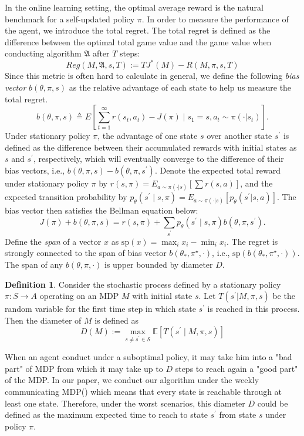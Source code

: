 \documentclass{article}
\theoremstyle{plain}
\theoremstyle{definition}
\newtheorem{definition}[theorem]{Definition}
\theoremstyle{remark}
\begin{document}
In the online learning setting, the optimal average reward is the natural benchmark for a self-updated policy $\pi$. In order to measure the performance of the agent, we introduce the total regret. The total regret is defined as the difference between the optimal total game value and the game value when conducting algorithm $\mathfrak{A}$ after $T$ steps:
\begin{equation}
Reg(M, \mathfrak{A}, s, T):=T J^*(M)-R(M, \pi, s, T)
\end{equation}
Since this metric is often hard to calculate in general, we define the following  \emph{bias vector} $b(\theta,\pi,s)$ \citep{NIPS2017_36e729ec} as the relative advantage of each state to help us measure the total regret.
\begin{equation}
b(\theta, \pi, s)\triangleq E\left[\sum_{t=1}^{\infty} r\left(s_{t}, a_{t}\right)-J(\pi) \mid s_{1}=s, a_{t} \sim \pi(\cdot |s_{t})\right].
\end{equation}
Under stationary policy $\pi$, the advantage of one state $s$ over another state $s^{\prime}$ is defined as the difference between their accumulated rewards with initial states as $s$ and $s^{\prime}$, respectively, which will eventually converge to the difference of their bias vectors, i.e., $b(\theta,\pi,s)-b(\theta,\pi,s^{\prime})$. Denote the expected total reward under stationary policy $\pi$ by $r(s,\pi) = E_{a \sim \pi(\cdot|s)}[\sum r(s,a)]$, and the expected transition probability by $p_{\theta}\left(s^{\prime} \mid s, \pi\right) = E_{a \sim \pi(\cdot|s)}[p_{\theta}(s^{\prime}|s,a)]$. The bias vector then satisfies the Bellman equation below:
\begin{equation}
\label{equation5}
J(\pi)+b(\theta, \pi, s)=r(s, \pi)+\sum_{s^{\prime}} p_{\theta}\left(s^{\prime} \mid s, \pi\right) b(\theta, \pi, s^{\prime}).
\end{equation}
Define the \emph{span} of a vector $x$ as $\mathrm{sp}(x) = \displaystyle\max_{i} x_{i} - \min_{i}x_{i}$. The regret is strongly connected to the span of bias vector $b(\theta_{*},\pi^{\star},\cdot)$, i.e., $\mathrm{sp}(b(\theta_{*},\pi^{\star},\cdot))$. The span of any $b(\theta,\pi,\cdot)$ is upper bounded by diameter $D$. 
\begin{definition} %
\label{definition1}
Consider the stochastic process defined by a stationary policy $\pi: S \rightarrow A$ operating on an MDP $M$ with initial state $s$. Let $T(s^{\prime}|M,\pi,s)$ be the random variable for the first time step in which state $s^{\prime}$ is reached in this process. Then the diameter of $M$ is defined as
$$
D(M):=\max _{s \neq s^{\prime} \in \mathcal{S}} \mathbb{E}\left[T\left(s^{\prime} \mid M, \pi, s\right)\right]
$$
\end{definition}
When an agent conduct under a suboptimal policy, it may take him into a "bad part" of MDP from which it may take up to $D$ steps to reach again a "good part" of the MDP. In our paper, we conduct our algorithm under the weekly communicating MDP(\cite{10.5555/3294771.3294898}) which means that every state is reachable through at least one state. Therefore, under the worst scenarios, this diameter $D$ could be defined as the maximum expected time to reach to state $s^{\prime}$ from state $s$ under policy $\pi$.
\end{document}
